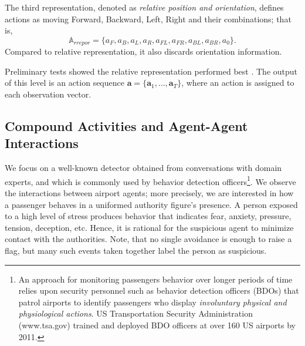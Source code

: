 The third representation, denoted as \emph{relative position and orientation}, defines actions as moving Forward, Backward, Left, Right and their combinations; that is, 
$$\mathbb{A}_{rrepor}=\{a_F, a_B, a_L, a_R, a_{FL}, a_{FR}, a_{BL}, a_{BR}, a_0\}.$$ Compared to relative representation, it also discards orientation information. 

Preliminary tests showed  the relative representation performed best \citep{Kaluza2011:PAIR}. The output of this level is an action sequence $\mathbf{a}=\{\mathbf{a}_1, \dots, \mathbf{a}_T\}$, where an action is assigned to each observation vector.







%
%
\subsection{Compound Activities and Agent-Agent Interactions}

We focus on a well-known detector obtained from conversations with domain experts, and which is commonly used by behavior detection officers\footnote{An approach for monitoring passengers behavior over longer periods of time relies upon security personnel such as behavior detection officers (BDOs) that patrol airports to identify passengers who display \emph{involuntary physical and physiological actions}. US Transportation Security Administration (www.tsa.gov) trained and deployed BDO officers at over 160 US airports by 2011.}.
We observe the interactions between airport agents; more precisely, we are interested in how a passenger behaves in a uniformed authority figure's presence. A person exposed to a high level of stress produces behavior that indicates fear, anxiety, pressure, tension, deception, etc. Hence, it is rational for the suspicious agent to minimize contact with the authorities. Note, that no single avoidance is enough to raise a flag, but many such events taken together label the person as suspicious. 

